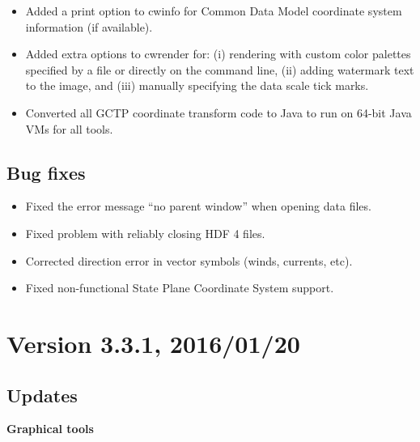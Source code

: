 \begin{itemize}

  \item Added a print option to cwinfo for Common Data Model coordinate 
  system information (if available).
  
  \item Added extra options to cwrender for: (i) rendering with custom color
  palettes specified by a file or directly on the command line, (ii) adding
  watermark text to the image, and (iii) manually specifying the data scale
  tick marks.

  \item Converted all GCTP coordinate transform code to Java to run on 64-bit
  Java VMs for all tools.

\end{itemize}

\subsection*{ Bug fixes}
\begin{itemize}

  \item Fixed the error message ``no parent window'' when opening data files.

  \item Fixed problem with reliably closing HDF 4 files.
  
  \item Corrected direction error in vector symbols (winds, currents, etc).

  \item Fixed non-functional State Plane Coordinate System support.

\end{itemize}


\section*{Version 3.3.1, 2016/01/20}

\subsection*{ Updates}

\hspace{0.4cm} {\bf Graphical tools}

